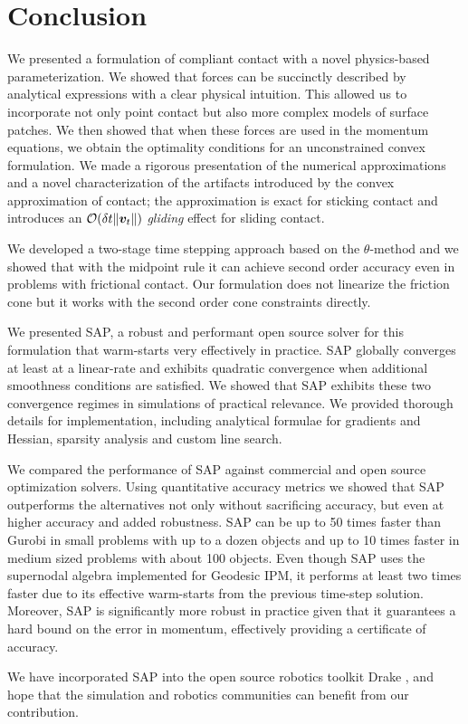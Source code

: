 \section{Conclusion}
\label{sec:future_directions}

We presented a formulation of compliant contact with a novel physics-based
parameterization. We showed that forces can be succinctly described by analytical
expressions with a clear physical intuition. This allowed us to incorporate not
only point contact but also more complex models of surface patches. We then showed
that when these forces are used in the momentum equations, we obtain the
optimality conditions for an unconstrained convex formulation. We made a
rigorous presentation of the numerical approximations and a novel
characterization of the artifacts introduced by the convex approximation of
contact; the approximation is exact for sticking contact and introduces an
$\mathcal{O}(\delta t\|{\bm{v}}_t\|)$ \emph{gliding} effect for sliding contact.

We developed a two-stage time stepping approach based on the
$\theta\text{-method}$ and we showed that with the midpoint rule it can achieve
second order accuracy even in problems with frictional contact. Our formulation
does not linearize the friction cone but it works with the second order cone
constraints directly.

We presented SAP, a robust and performant open source solver for this formulation that
warm-starts very effectively in practice. SAP 
globally converges at least at a linear-rate and exhibits quadratic convergence when additional smoothness conditions are satisfied. We showed that SAP
exhibits these two convergence regimes in simulations of practical relevance. We
provided thorough details for implementation, including analytical
formulae for gradients and Hessian, sparsity analysis and custom line search.

We compared the performance of SAP against commercial and open source
optimization solvers. Using quantitative accuracy metrics we showed that SAP
outperforms the alternatives not only without sacrificing accuracy, but even at
higher accuracy and added robustness. SAP can be up to 50 times faster than
Gurobi in small problems with up to a dozen objects and up to 10 times faster in
medium sized problems with about 100 objects. Even though SAP uses the
supernodal algebra implemented for Geodesic IPM, it performs at least two times
faster due to its effective warm-starts from the previous time-step
solution. Moreover, SAP is significantly more robust in practice given
that it guarantees a hard bound on the error in momentum, effectively providing
a certificate of accuracy.

We have incorporated SAP into the open source robotics toolkit Drake
\cite{bib:drake}, and hope that the simulation and robotics communities can
benefit from our contribution.
